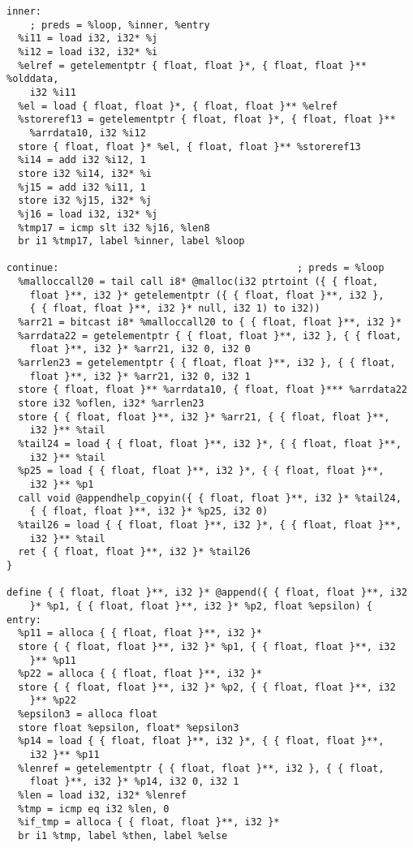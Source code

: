 \documentclass[main.tex]{subfiles}
\begin{document}
{\begin{lstlisting}
inner:                                            
    ; preds = %loop, %inner, %entry
  %i11 = load i32, i32* %j
  %i12 = load i32, i32* %i
  %elref = getelementptr { float, float }*, { float, float }** %olddata,
    i32 %i11
  %el = load { float, float }*, { float, float }** %elref
  %storeref13 = getelementptr { float, float }*, { float, float }** 
    %arrdata10, i32 %i12
  store { float, float }* %el, { float, float }** %storeref13
  %i14 = add i32 %i12, 1
  store i32 %i14, i32* %i
  %j15 = add i32 %i11, 1
  store i32 %j15, i32* %j
  %j16 = load i32, i32* %j
  %tmp17 = icmp slt i32 %j16, %len8
  br i1 %tmp17, label %inner, label %loop

continue:                                         ; preds = %loop
  %malloccall20 = tail call i8* @malloc(i32 ptrtoint ({ { float, 
    float }**, i32 }* getelementptr ({ { float, float }**, i32 }, 
    { { float, float }**, i32 }* null, i32 1) to i32))
  %arr21 = bitcast i8* %malloccall20 to { { float, float }**, i32 }*
  %arrdata22 = getelementptr { { float, float }**, i32 }, { { float,
    float }**, i32 }* %arr21, i32 0, i32 0
  %arrlen23 = getelementptr { { float, float }**, i32 }, { { float, 
    float }**, i32 }* %arr21, i32 0, i32 1
  store { float, float }** %arrdata10, { float, float }*** %arrdata22
  store i32 %oflen, i32* %arrlen23
  store { { float, float }**, i32 }* %arr21, { { float, float }**,
    i32 }** %tail
  %tail24 = load { { float, float }**, i32 }*, { { float, float }**,
    i32 }** %tail
  %p25 = load { { float, float }**, i32 }*, { { float, float }**, 
    i32 }** %p1
  call void @appendhelp_copyin({ { float, float }**, i32 }* %tail24,
    { { float, float }**, i32 }* %p25, i32 0)
  %tail26 = load { { float, float }**, i32 }*, { { float, float }**,
    i32 }** %tail
  ret { { float, float }**, i32 }* %tail26
}

define { { float, float }**, i32 }* @append({ { float, float }**, i32
    }* %p1, { { float, float }**, i32 }* %p2, float %epsilon) {
entry:
  %p11 = alloca { { float, float }**, i32 }*
  store { { float, float }**, i32 }* %p1, { { float, float }**, i32
    }** %p11
  %p22 = alloca { { float, float }**, i32 }*
  store { { float, float }**, i32 }* %p2, { { float, float }**, i32
    }** %p22
  %epsilon3 = alloca float
  store float %epsilon, float* %epsilon3
  %p14 = load { { float, float }**, i32 }*, { { float, float }**,
    i32 }** %p11
  %lenref = getelementptr { { float, float }**, i32 }, { { float,
    float }**, i32 }* %p14, i32 0, i32 1
  %len = load i32, i32* %lenref
  %tmp = icmp eq i32 %len, 0
  %if_tmp = alloca { { float, float }**, i32 }*
  br i1 %tmp, label %then, label %else


\end{lstlisting}}
\end{document}

